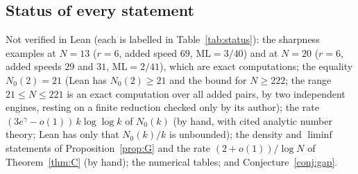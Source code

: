 \documentclass[11pt]{article}
\theoremstyle{definition}
\theoremstyle{remark}
\newcommand{\ML}{\mathrm{ML}}
\begin{document}
\subsection{Status of every statement}
Not verified in Lean (each is labelled in Table~\ref{tab:status}): the sharpness examples at $N=13$ ($r=6$, added speed $69$, $\ML=3/40$) and at $N=20$ ($r=6$, added speeds $29$ and $31$, $\ML=2/41$), which are exact computations; the equality $N_0(2)=21$ (Lean has $N_0(2)\ge21$ and the bound for $N\ge222$; the range $21\le N\le221$ is an exact computation over all added pairs, by two independent engines, resting on a finite reduction checked only by its author); the rate $(3e^{\gamma}-o(1))\,k\log\log k$ of $N_0(k)$ (by hand, with cited analytic number theory; Lean has only that $N_0(k)/k$ is unbounded); the density and $\liminf$ statements of Proposition~\ref{prop:G} and the rate $(2+o(1))/\log N$ of Theorem~\ref{thm:C} (by hand); the numerical tables; and Conjecture~\ref{conj:gap}.
\end{document}
